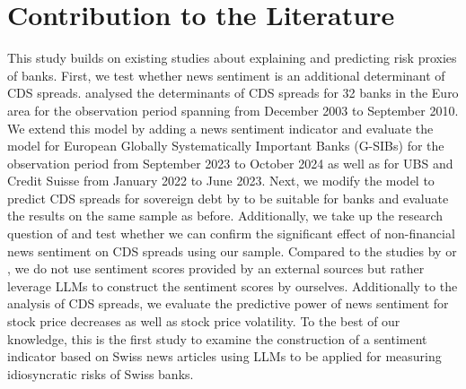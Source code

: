 %


\section{Contribution to the Literature}

This study builds on existing studies about explaining and predicting risk proxies of banks. First, we test whether news sentiment is an additional determinant of CDS spreads. \cite{annaert2013} analysed the determinants of CDS spreads for 32 banks in the Euro area for the observation period spanning from December 2003 to September 2010. We extend this model by adding a news sentiment indicator and evaluate the model for European Globally Systematically Important Banks (G-SIBs) for the observation period from September 2023 to October 2024 as well as for UBS and Credit Suisse from January 2022 to June 2023. Next, we modify the model to predict CDS spreads for sovereign debt by \cite{cathcart2020} to be suitable for banks and evaluate the results on the same sample as before. Additionally, we take up the research question of \cite{roeder2020} and test whether we can confirm the significant effect of non-financial news sentiment on CDS spreads using our sample. Compared to the studies by \cite{smales2016} or \cite{roeder2020}, we do not use sentiment scores provided by an external sources but rather leverage LLMs to construct the sentiment scores by ourselves. Additionally to the analysis of CDS spreads, we evaluate the predictive power of news sentiment for stock price decreases as well as stock price volatility. To the best of our knowledge, this is the first study to examine the construction of a sentiment indicator based on Swiss news articles using LLMs to be applied for measuring idiosyncratic risks of Swiss banks. 



\cleardoublepage
